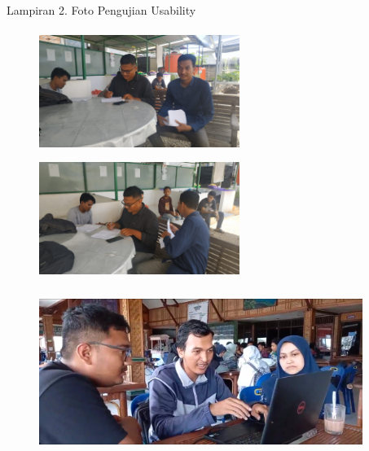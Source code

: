 \begin{appendices}{Lampiran 2. Foto Pengujian Usability}
        

    \begin{figure}[H]
        \includegraphics[width=6.5cm,height=4cm]{gambar/dokumentasi/foto4}
        \hspace*{0.2cm}
        \includegraphics[width=6.5cm,height=4cm]{gambar/dokumentasi/foto6}
    \end{figure}
    \begin{figure}[H]
        \hspace*{1.5cm}
        \includegraphics[width=10.5cm,height=5cm]{gambar/dokumentasi/doku testi}
    \end{figure}
        
        
\end{appendices}

